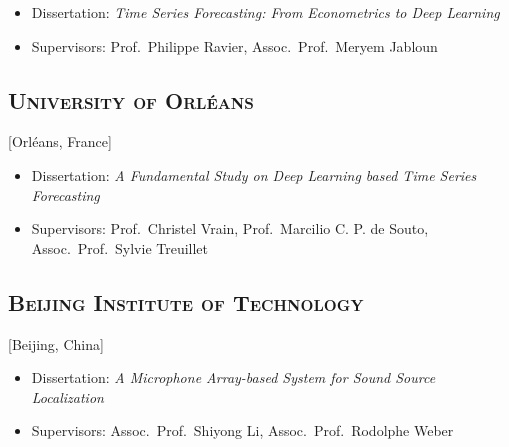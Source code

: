 \documentclass{mycv}
\begin{document}
\begin{itemize}
  \itemsep 0em
  \item Dissertation: \textit{Time Series Forecasting: From Econometrics to Deep Learning}
  \item Supervisors: Prof.~Philippe Ravier, Assoc.~Prof.~Meryem Jabloun
\end{itemize}

\vspace{-\parskip}

\subsection{\large \scshape University of Orl\'eans}[Orl\'eans, France]

\begin{positions}
\end{positions}

\begin{itemize}
  \itemsep 0em
  \item Dissertation: \textit{A Fundamental Study on Deep Learning based Time Series Forecasting}
  \item Supervisors: Prof.~Christel Vrain, Prof.~Marcilio C. P. de Souto, Assoc.~Prof.~Sylvie Treuillet
\end{itemize}

\vspace{-\parskip}

\subsection{\large \scshape Beijing Institute of Technology}[Beijing, China]

\begin{positions}
\end{positions}

\begin{itemize}
  \itemsep 0em
  \item Dissertation: \textit{A Microphone Array-based System for Sound Source Localization}
  \item Supervisors: Assoc.~Prof.~Shiyong Li, Assoc.~Prof.~Rodolphe Weber
\end{itemize}

\vspace{-1em}
\end{document}
